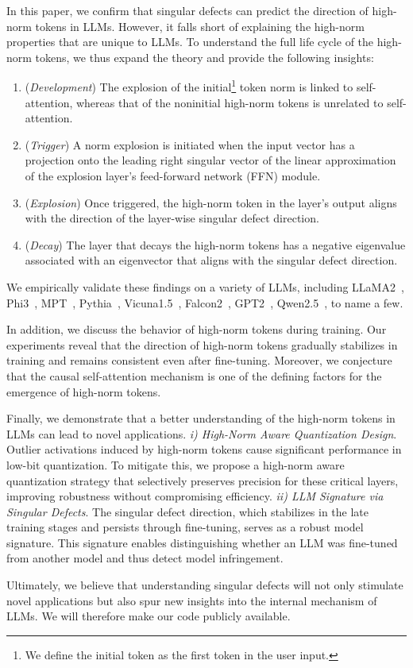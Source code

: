 In this paper, we confirm that singular defects can predict the direction of high-norm tokens in LLMs.
However, it falls short of explaining the high-norm properties that are unique to LLMs.
To understand the full life cycle of the high-norm tokens,
we thus expand the theory and
provide the following insights:
\begin{enumerate}
    \item (\emph{Development}) The explosion of the initial\footnote{We define the initial token as the first token in the user input.} token norm is linked to self-attention, whereas that of the noninitial high-norm tokens is unrelated to self-attention.
    \item (\emph{Trigger}) A norm explosion is initiated when the input vector has a projection onto the leading right singular vector of the linear approximation of the explosion layer's feed-forward network (FFN) module.
    \item (\emph{Explosion}) Once triggered, the high-norm token in the layer's output aligns with the direction of the layer-wise singular defect direction.
    \item (\emph{Decay}) The layer that decays the high-norm tokens has a negative eigenvalue associated with an eigenvector that aligns with the singular defect direction.
\end{enumerate}

We empirically validate these findings on a variety of LLMs, including LLaMA2~\cite{touvron2023llama}, Phi3~\cite{abdin2024phi}, MPT~\cite{MosaicML2023Introducing}, Pythia~\cite{biderman2023pythia}, Vicuna1.5~\cite{platzer2021vicuna}, Falcon2~\cite{malartic2024falcon211btechnicalreport}, GPT2~\cite{radford2019language}, Qwen2.5~\cite{qwen25}, to name a few.

In addition, we discuss the behavior of high-norm tokens during training.
Our experiments reveal that the direction of high-norm tokens gradually stabilizes in training and remains consistent even after fine-tuning.
Moreover, we conjecture that the causal self-attention mechanism is one of the defining factors for the emergence of high-norm tokens.

Finally, we demonstrate that a better understanding of the high-norm tokens in LLMs can lead to novel applications.
\emph{i) High-Norm Aware Quantization Design}.
Outlier activations induced by high-norm tokens cause significant performance in low-bit quantization.
To mitigate this, we propose a high-norm aware quantization strategy that selectively preserves precision for these critical layers, improving robustness without compromising efficiency.
\emph{ii) LLM Signature via Singular Defects}.
The singular defect direction, which stabilizes in the late training stages and persists through fine-tuning, serves as a robust model signature.
This signature enables distinguishing whether an LLM was fine-tuned from another model and thus detect model infringement.

Ultimately, we believe that understanding singular defects will not only stimulate novel applications but also spur new insights into the internal mechanism of LLMs. We will therefore make our code publicly available.
